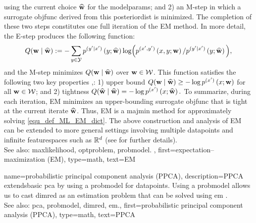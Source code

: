 {{		using the current choice $\widehat{{\bf w}}$ for the \glspl{modelparam}; and 
		2) an M-step in which a surrogate \gls{objfunc} derived from this \gls{posteriordist} is minimized.
		The completion of these two steps constitutes one full \gls{iteration} of 
		the EM method. 
		In more detail, the E-step produces the following \gls{function}:
		\[
		Q({\bf w} \mid \widehat{{\bf w}})
		:= 
		- \sum_{y \in \mathcal{Y}} 
		p^{(y'|x')}\left(y;\widehat{{\bf w}}\right)
		\log\!\Big(
		p^{(x',y')}\left(x,y;{\bf w}\right)
		/p^{(y'|x')}\left(y;\widehat{{\bf w}}\right)
		\Big),
		\]
		and the M-step minimizes $Q({\bf w} \mid \widehat{{\bf w}})$ over 
		${\bf w} \in \mathcal{W}$.
		This \gls{function} satisfies the following two key properties 
		\cite[Sec. 9.4]{BishopBook},\cite[Sec. 11.4.7]{Murphy2012}:
		1) upper bound
		$Q({\bf w}\mid \widehat{{\bf w}})
		\geq
		- \log p^{(x')}\left(x;{\bf w}\right)$
		for all ${\bf w} \in \mathcal{W}$;
		and 2) tightness
		$Q(\widehat{{\bf w}}\mid \widehat{{\bf w}})
		=- \log p^{(x')}\left(x;\widehat{{\bf w}}\right).$
		To summarize, during each \gls{iteration}, EM minimizes an upper-bounding 
		surrogate \gls{objfunc} that is tight at the current iterate $\widehat{{\bf w}}$. 
		Thus, EM is a \gls{majmin} method for approximately solving \eqref{equ_def_ML_EM_dict}. 
		The above construction and analysis of EM can be extended to more 
		general settings involving multiple \glspl{datapoint} 
		and infinite \glspl{featurespace} such as $\mathbb{R}^{d}$ 
		(see \cite[Sec. 11.4.7]{Murphy2012} for further details). 
			\\
		See also: \gls{maxlikelihood}, \gls{optproblem}, \gls{probmodel}. },
	first={expectation–maximization (EM)},
	type=math, 
	text={EM}
}

{name={probabilistic principal component analysis (PPCA)}, 
	description={PPCA 
		extends\linebreak basic \gls{pca} by using a \gls{probmodel} for \glspl{datapoint}. 
		Using a \gls{probmodel} allows us to cast \gls{dimred} as an estimation problem 
		that can be solved using \gls{em} \cite{TippingProbPCA}.
				\\
		See also: \gls{pca}, \gls{probmodel}, \gls{dimred}, \gls{em}.},
	first={probabilistic principal component analysis (PPCA)},
	type=math, 
	text={PPCA}
}

